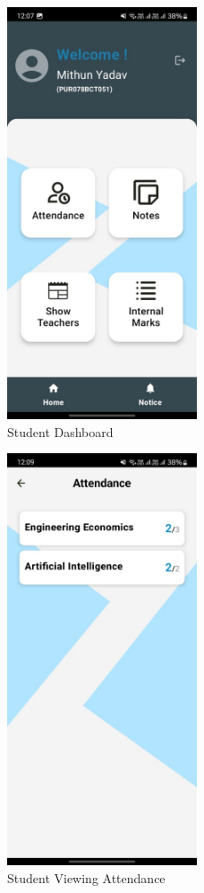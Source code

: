 \begin{figure}[H]
    \centering
    \includegraphics[width=0.5\textwidth]{Graphics/output/student_dashboard.jpg}
    \caption{Student Dashboard}
    \label{fig:student_dashboard}
\end{figure}

\begin{figure}[H]
    \centering
    \includegraphics[width=0.5\textwidth]{Graphics/output/student_attendance.jpg}
    \caption{Student Viewing Attendance}
    \label{fig:student_attendance}
\end{figure}

